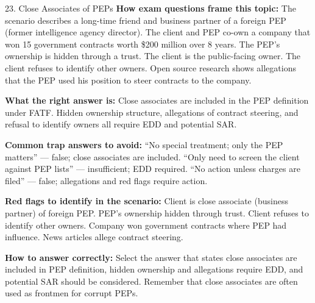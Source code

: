 \documentclass[11pt,a4paper]{beamer}
\begin{document}
	\begin{frame}{23. Close Associates of PEPs}
		\tiny
		\noindent\textbf{How exam questions frame this topic:} The scenario describes a long-time friend and business partner of a foreign PEP (former intelligence agency director). The client and PEP co-own a company that won 15 government contracts worth \$200 million over 8 years. The PEP's ownership is hidden through a trust. The client is the public-facing owner. The client refuses to identify other owners. Open source research shows allegations that the PEP used his position to steer contracts to the company.
		
		\vspace{0.1cm}
		\noindent\textbf{What the right answer is:} Close associates are included in the PEP definition under FATF. Hidden ownership structure, allegations of contract steering, and refusal to identify owners all require EDD and potential SAR.
		
		\vspace{0.1cm}
		\noindent\textbf{Common trap answers to avoid:} “No special treatment; only the PEP matters” — false; close associates are included. “Only need to screen the client against PEP lists” — insufficient; EDD required. “No action unless charges are filed” — false; allegations and red flags require action.
		
		\vspace{0.1cm}
		\noindent\textbf{Red flags to identify in the scenario:} Client is close associate (business partner) of foreign PEP. PEP's ownership hidden through trust. Client refuses to identify other owners. Company won government contracts where PEP had influence. News articles allege contract steering.
		
		\vspace{0.1cm}
		\noindent\textbf{How to answer correctly:} Select the answer that states close associates are included in PEP definition, hidden ownership and allegations require EDD, and potential SAR should be considered. Remember that close associates are often used as frontmen for corrupt PEPs.
	\end{frame}
	
\end{document}
